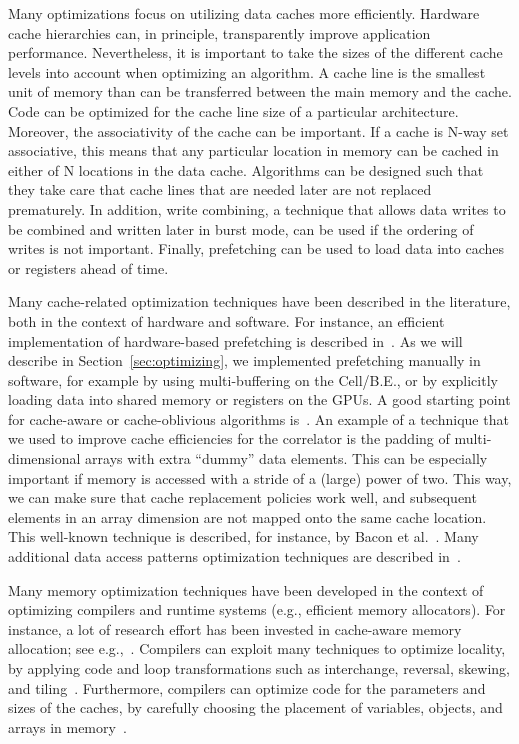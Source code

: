 \documentclass{article}
\begin{document}
Many optimizations focus on utilizing data caches more efficiently.
Hardware cache hierarchies can, in principle, transparently improve application performance.
Nevertheless, it is important to take the sizes of the
different cache levels into account when optimizing an algorithm.  A
cache line is the smallest unit of memory than can be transferred
between the main memory and the cache.  Code can be optimized for the
cache line size of a particular architecture.  Moreover, the
associativity of the cache can be important.  If a cache is N-way set
associative, this means that any particular location in memory can be
cached in either of N locations in the data cache. Algorithms can be
designed such that they take care that cache lines that are needed
later are not replaced prematurely. 
In addition, write combining,
a technique that allows data writes to be combined and written later in burst mode,
can be used if the ordering of writes is not important.
Finally, prefetching can be used to load data into caches or registers ahead of time.

Many cache-related optimization techniques have been described in the
literature, both in the context of hardware and software. For
instance, an efficient implementation of hardware-based prefetching is
described in~\cite{Chen95effectivehardware-based}.  As we will
describe in Section~\ref{sec:optimizing}, we implemented prefetching
manually in software, for example by using multi-buffering on the
\mbox{Cell/B.E.}, or by explicitly loading data into shared memory or
registers on the GPUs.  A good starting point for cache-aware or
cache-oblivious algorithms is~\cite{cache}. An example of a technique
that we used to improve cache efficiencies for the correlator is the
padding of multi-dimensional arrays with extra ``dummy'' data
elements.  This can be especially important if memory is accessed with
a stride of a (large) power of two.  This way, we can make sure that
cache replacement policies work well, and subsequent elements in an
array dimension are not mapped onto the same cache location.  This
well-known technique is described, for instance, by Bacon et
al.~\cite{cache-tlb-compiler}.  Many additional data access patterns
optimization techniques are described in~\cite{data-access}.

Many memory optimization techniques have been developed in the context
of optimizing compilers and runtime systems (e.g., efficient memory allocators). 
For instance, a lot of research effort has been invested in cache-aware memory allocation; see
e.g.,~\cite{Wilson95dynamicstorage}.  Compilers can exploit many
techniques to optimize locality, by applying code and loop
transformations such as interchange, reversal, skewing, and
tiling~\cite{data-locality}.  Furthermore, compilers can optimize code for
the parameters and sizes of the caches, by carefully choosing the
placement of variables, objects, and arrays in
memory~\cite{Panda96memorydata}.
\end{document}
